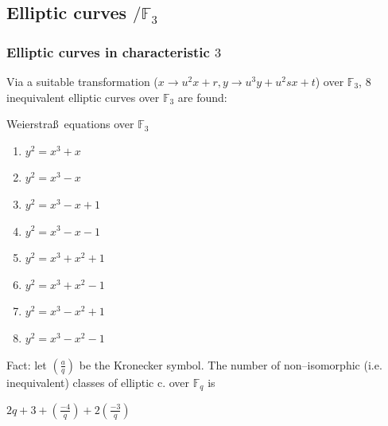 \documentclass[handout]{beamer}%
\newcommand{\F}{\mathbb F}
\theoremstyle{definition}
\begin{document}
\subsection{Elliptic curves \texorpdfstring{$/\F_3$}{F3}}
\begin{frame}
\frametitle{Elliptic curves in characteristic $3$}

Via a suitable transformation ($x\rightarrow u^2x+r, y\rightarrow u^3y+u^2sx+t$) over $\F_3$,  $8$ inequivalent
elliptic curves over $\F_3$ are found:\pause

\begin{beamerboxesrounded}[upper=block title example,lower=block body alerted,shadow=true]{Weierstra\ss\ equations over $\F_3$}
\begin{enumerate}
 \item $y^2=x^3+x$
 \item$y^2=x^3 - x$
 \item$y^2=x^3 - x +1$
 \item$y^2=x^3 - x -1$
 \item$y^2=x^3 + x^2 + 1$
 \item$y^2=x^3 + x^2 - 1$
 \item$y^2=x^3 - x^2 + 1$
 \item$y^2=x^3 - x^2 - 1$
 \end{enumerate}
\end{beamerboxesrounded}\pause

\vspace*{-3mm}\begin{beamerboxesrounded}[upper=postit,lower=block body,shadow=true]{Fact: let $\left(\frac{a}{q}\right)$ be the Kronecker symbol. The number of non--isomorphic (i.e. inequivalent) classes of elliptic c. over $\F_q$ is }
\centerline{$2q+3+\left(\frac{-4}{q}\right)+2\left(\frac{-3}{q}\right)$}
\end{beamerboxesrounded}




\end{frame}
\end{document}
